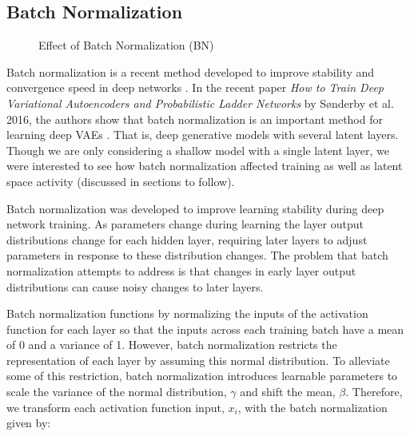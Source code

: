 \documentclass{article} %
\begin{document}
%


\subsection{Batch Normalization}
%
\begin{wrapfigure}{l}{0.5\textwidth}
    \resizebox{\linewidth}{!}{}
    \caption{Effect of Batch Normalization (BN)}
    \label{fig:bncost}
\end{wrapfigure}

Batch normalization is a recent method developed to improve stability and convergence speed in deep networks \cite{Ioffe2015}. In the recent paper \textit{How to Train Deep Variational Autoencoders and Probabilistic Ladder Networks} by S\o nderby et al. 2016, the authors show that batch normalization is an important method for learning deep VAEs \cite{Sonderby2016}. That is, deep generative models with several latent layers. Though we are only considering a shallow model with a single latent layer, we were interested to see how batch normalization affected training as well as latent space activity (discussed in sections to follow).
\par Batch normalization was developed to improve learning stability during deep network training. As parameters change during learning the layer output distributions change for each hidden layer, requiring later layers to adjust parameters in response to these distribution changes. The problem that batch normalization attempts to address is that changes in early layer output distributions can cause noisy changes to later layers. 
\par Batch normalization functions by normalizing the inputs of the activation function for each layer so that the inputs across each training batch have a mean of 0 and a variance of 1. However, batch normalization restricts the representation of each layer by assuming this normal distribution. To alleviate some of this restriction, batch normalization introduces learnable parameters to scale the variance of the normal distribution, $\gamma$ and shift the mean, $\beta$. Therefore, we transform each activation function input, $x_i$, with the batch normalization given by:
\end{document}
